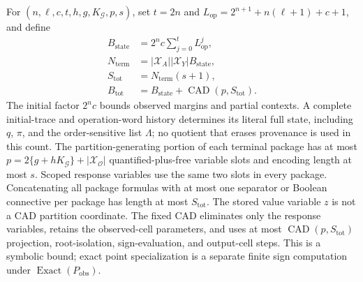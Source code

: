 For \((n,\ell,c,t,h,g,K_{\mathcal G},p,s)\), set \(t=2n\) and \(L_{\mathrm{op}}=2^{n+1}+n(\ell+1)+c+1\), and define
\[
\begin{aligned}
B_{\mathrm{state}}&=2^n c\sum_{j=0}^{t}L_{\mathrm{op}}^j,\\
N_{\mathrm{term}}&=|\mathcal X_A||\mathcal X_Y|B_{\mathrm{state}},\\
S_{\mathrm{tot}}&=N_{\mathrm{term}}(s+1),\\
B_{\mathrm{tot}}&=B_{\mathrm{state}}+\operatorname{CAD}(p,S_{\mathrm{tot}}).
\end{aligned}
\]
The initial factor \(2^n c\) bounds observed margins and partial contexts. A complete initial-trace and operation-word history determines its literal full state, including \(q\), \(\pi\), and the order-sensitive list \(\Lambda\); no quotient that erases provenance is used in this count. The partition-generating portion of each terminal package has at most \(p=2\{g+hK_{\mathcal G}\}+|\mathcal X_{\mathcal O}|\) quantified-plus-free variable slots and encoding length at most \(s\). Scoped response variables use the same two slots in every package. Concatenating all package formulas with at most one separator or Boolean connective per package has length at most \(S_{\mathrm{tot}}\). The stored value variable \(z\) is not a CAD partition coordinate. The fixed CAD eliminates only the response variables, retains the observed-cell parameters, and uses at most \(\operatorname{CAD}(p,S_{\mathrm{tot}})\) projection, root-isolation, sign-evaluation, and output-cell steps. This is a symbolic bound; exact point specialization is a separate finite sign computation under \(\operatorname{Exact}(P_{\mathrm{obs}})\).